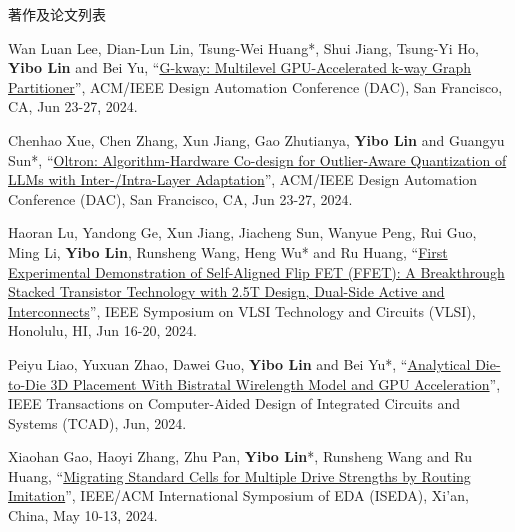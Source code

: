\begin{rSection}{著作及论文列表}
\begin{description}[font=\normalfont, rightmargin=2em]
{}
            

\item[{[C151]}]{
        Wan Luan Lee, Dian-Lun Lin, Tsung-Wei Huang*, Shui Jiang, Tsung-Yi Ho, \textbf{Yibo Lin} and Bei Yu, 
    ``\href{https://doi.org/10.1145/3649329.3656238}{G-kway: Multilevel GPU-Accelerated k-way Graph Partitioner}'', 
    ACM/IEEE Design Automation Conference (DAC), San Francisco, CA, Jun 23-27, 2024.
    
}
            

\item[{[C150]}]{
        Chenhao Xue, Chen Zhang, Xun Jiang, Gao Zhutianya, \textbf{Yibo Lin} and Guangyu Sun*, 
    ``\href{https://doi.org/10.1145/3649329.3656221}{Oltron: Algorithm-Hardware Co-design for Outlier-Aware Quantization of LLMs with Inter-/Intra-Layer Adaptation}'', 
    ACM/IEEE Design Automation Conference (DAC), San Francisco, CA, Jun 23-27, 2024.
    
}
            

\item[{[C149]}]{
        Haoran Lu, Yandong Ge, Xun Jiang, Jiacheng Sun, Wanyue Peng, Rui Guo, Ming Li, \textbf{Yibo Lin}, Runsheng Wang, Heng Wu* and Ru Huang, 
    ``\href{https://doi.org/10.1109/VLSITechnologyandCir46783.2024.10631460}{First Experimental Demonstration of Self-Aligned Flip FET (FFET): A Breakthrough Stacked Transistor Technology with 2.5T Design, Dual-Side Active and Interconnects}'', 
    IEEE Symposium on VLSI Technology and Circuits (VLSI), Honolulu, HI, Jun 16-20, 2024.
    
}
            

\item[{[J148]}]{
        Peiyu Liao, Yuxuan Zhao, Dawei Guo, \textbf{Yibo Lin} and Bei Yu*, 
    ``\href{https://doi.org/10.1109/TCAD.2023.3347293}{Analytical Die-to-Die 3D Placement With Bistratal Wirelength Model and GPU Acceleration}'', 
    IEEE Transactions on Computer-Aided Design of Integrated Circuits and Systems (TCAD), Jun, 2024.
    
}
            

\item[{[C147]}]{
        Xiaohan Gao, Haoyi Zhang, Zhu Pan, \textbf{Yibo Lin}*, Runsheng Wang and Ru Huang, 
    ``\href{https://doi.org/10.1109/ISEDA62518.2024.10617650}{Migrating Standard Cells for Multiple Drive Strengths by Routing Imitation}'', 
    IEEE/ACM International Symposium of EDA (ISEDA), Xi'an, China, May 10-13, 2024.
    
}
            


\end{description}
\end{rSection}
